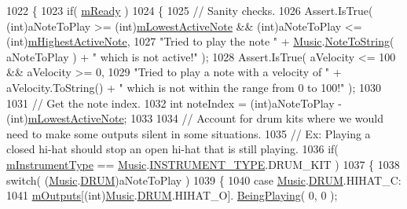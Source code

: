 \begin{DoxyCode}
1022     \{
1023         \textcolor{keywordflow}{if}( \hyperlink{group___v_i_m_priv_ga983a11920bf16794735cc193c327ac42}{mReady} )
1024         \{
1025             \textcolor{comment}{// Sanity checks.}
1026             Assert.IsTrue( (\textcolor{keywordtype}{int})aNoteToPlay >= (\textcolor{keywordtype}{int})\hyperlink{group___v_i_m_priv_ga5e3a5116e0dabb37e0ea21d73ac1567e}{mLowestActiveNote} && (\textcolor{keywordtype}{int})aNoteToPlay 
      <= (\textcolor{keywordtype}{int})\hyperlink{group___v_i_m_priv_ga73a09a4e4f09c0e5b3871dc9ad6c757e}{mHighestActiveNote},
1027                 \textcolor{stringliteral}{"Tried to play the note "} + \hyperlink{class_music}{Music}.\hyperlink{group___music_stat_func_ga85a22c905d56d4c5f4e62159bfecee8c}{NoteToString}( aNoteToPlay ) + \textcolor{stringliteral}{" which is
       not active!"} );
1028             Assert.IsTrue( aVelocity <= 100 && aVelocity >= 0,
1029                 \textcolor{stringliteral}{"Tried to play a note with a velocity of "} + aVelocity.ToString() + \textcolor{stringliteral}{" which is not within
       the range from 0 to 100!"} );
1030 
1031             \textcolor{comment}{// Get the note index.}
1032             \textcolor{keywordtype}{int} noteIndex = (int)aNoteToPlay - (\textcolor{keywordtype}{int})\hyperlink{group___v_i_m_priv_ga5e3a5116e0dabb37e0ea21d73ac1567e}{mLowestActiveNote};
1033 
1034             \textcolor{comment}{// Account for drum kits where we would need to make some outputs silent in some situations.}
1035             \textcolor{comment}{// Ex: Playing a closed hi-hat should stop an open hi-hat that is still playing.}
1036             \textcolor{keywordflow}{if}( \hyperlink{group___v_i_m_priv_ga108c350257b3a2080e06cd4a8251f6a4}{mInstrumentType} == \hyperlink{class_music}{Music}.\hyperlink{group___music_enums_gabfce60192305965558a36e368ebd67c3}{INSTRUMENT\_TYPE}.DRUM\_KIT )
1037             \{
1038                 \textcolor{keywordflow}{switch}( (\hyperlink{class_music}{Music}.\hyperlink{group___music_enums_gade475b4382c7066d1af13e7c13c029b6}{DRUM})aNoteToPlay )
1039                 \{
1040                     \textcolor{keywordflow}{case} \hyperlink{class_music}{Music}.\hyperlink{group___music_enums_gade475b4382c7066d1af13e7c13c029b6}{DRUM}.HIHAT\_C:
1041                         \hyperlink{group___v_i_m_priv_ga53f837fd01475fa35629a650e7fa00e3}{mOutputs}[(int)\hyperlink{class_music}{Music}.\hyperlink{group___music_enums_gade475b4382c7066d1af13e7c13c029b6}{DRUM}.HIHAT\_O].
      \hyperlink{group___n_o_o_pub_func_ga2bdaa2787408f353f71ef6c6a18e9285}{BeingPlaying}( 0, 0 );

\end{DoxyCode}
